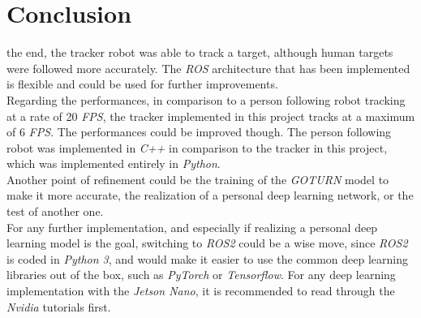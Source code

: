 \clearpage

\section*{Conclusion}

\begin{comment}
	
	Compare to the paper on the person following which had a 20 Fps. (check whether or not they did it in c++)
	What has been implemented and what has not been implemented.
	Ideas for further development : ROS2, c++

\end{comment}

 the end, the tracker robot was able to track 
a target, although human targets were followed 
more accurately. The \textit{ROS} architecture
that has been implemented is flexible and could
be used for further improvements.
\\\indent Regarding the performances, in 
comparison to a person following robot \cite{personfollowing}
tracking at a rate of 20 \textit{FPS}, the tracker
implemented in this project tracks at a maximum of 6 \textit{FPS}.
The performances could be improved though. The person 
following robot was implemented in \textit{C++} in 
comparison to the tracker in this project, which was 
implemented entirely in \textit{Python}.
\\\indent Another point of refinement could be the 
training of the \textit{GOTURN} model to make 
it more accurate, the realization of a personal 
deep learning network, or the test of another one.
\\\indent For any further implementation, 
and especially if realizing a personal 
deep learning model is the goal, switching to \textit{ROS2}
could be a wise move, since \textit{ROS2}
is coded in \textit{Python 3}, and would make it easier to 
use the common deep learning libraries out of the box, such 
as \textit{PyTorch} or \textit{Tensorflow}. 
For any deep learning implementation with the \textit{Jetson Nano}, 
it is recommended to read through the \textit{Nvidia} tutorials  first\cite{dptuto}.